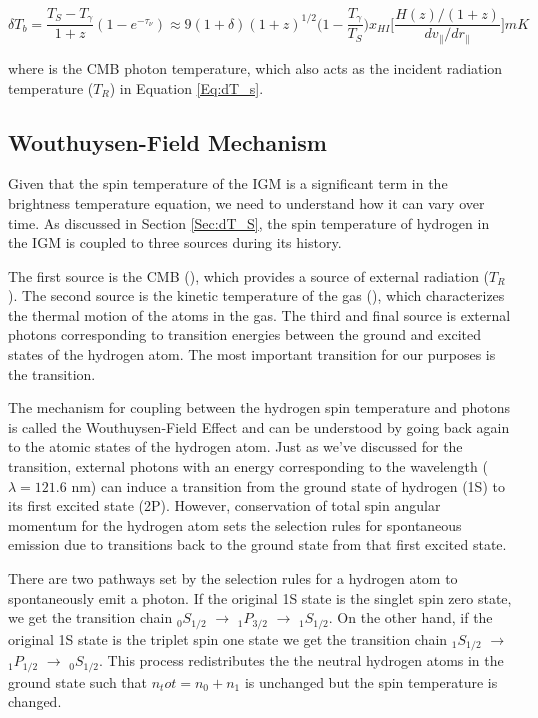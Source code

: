 \begin{equation}\label{Eq:dT_b}
\delta T_b = \frac{T_S - T_\gamma}{1+z}(1-e^{-\tau_\nu}) \approx 9 (1+\delta) (1+z)^{1/2} \Big(1-\frac{T_\gamma}{T_S}\Big) x_{HI} \Big[ \frac{H(z)/(1+z)}{dv_{\parallel}/dr_{\parallel}} \Big] mK
\end{equation}

where \tg is the CMB photon temperature, which also acts as the incident radiation temperature ($T_R$) in Equation \ref{Eq:dT_s}. 

\subsection{Wouthuysen-Field Mechanism}\label{Sec:WFM}
Given that the spin temperature of the IGM is a significant term in the brightness temperature equation, we need to understand how it can vary over time. As discussed in Section \ref{Sec:dT_S}, the spin temperature of hydrogen in the IGM is coupled to three sources during its history. 

The first source is the CMB (\tg), which provides a source of external radiation ($T_R$). The second source is the kinetic temperature of the gas (\tk), which characterizes the thermal motion of the atoms in the gas. The third and final source is external photons corresponding to transition energies between the ground and excited states of the hydrogen atom. The most important transition for our purposes is the \lya  transition. 

The mechanism for coupling between the hydrogen spin temperature and \lya  photons is called the Wouthuysen-Field Effect \cite{wouthuysen_1952}\cite{field_1958} and can be understood by going back again to the atomic states of the hydrogen atom. Just as we've discussed for the \cm transition, external photons with an energy corresponding to the \lya  wavelength ($\lambda = 121.6$ nm) can induce a transition from the ground state of hydrogen (1S) to its first excited state (2P). However, conservation of total spin angular momentum for the hydrogen atom sets the selection rules for spontaneous emission due to transitions back to the ground state from that first excited state. 

There are two pathways set by the selection rules for a hydrogen atom to spontaneously emit a \lya  photon. If the original 1S state is the singlet spin zero state, we get the transition chain $_0S_{1/2}$ $\rightarrow$ $_1P_{3/2}$ $\rightarrow$ $_1S_{1/2}$. On the other hand, if the original 1S state is the triplet spin one state we get the transition chain $_1S_{1/2}$ $\rightarrow$ $_1P_{1/2}$ $\rightarrow$ $_0S_{1/2}$. This process redistributes the the neutral hydrogen atoms in the ground state such that $n_tot = n_0 + n_1$ is unchanged but the spin temperature is changed. 

